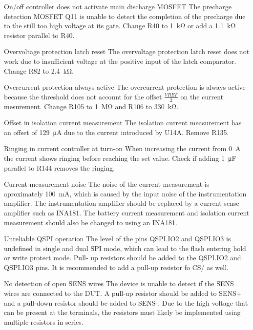 \begin{ModTable}
\ModItemOpen
{On/off controller does not activate main discharge MOSFET}
{The precharge detection MOSFET Q11 is unable to detect the completion of the precharge due to the still too high voltage at its gate. }
{Change R40 to \qty{1}{\kilo\ohm} or add a \qty{1.1}{\kilo\ohm} resistor parallel to R40. }
{}
{}

\ModItemOpen
{Overvoltage protection latch reset}
{The overvoltage protection latch reset does not work due to insufficient voltage at the positive input of the latch comparator. }
{Change R82 to \qty{2.4}{\kilo\ohm}. }
{}
{}

\ModItemOpen
{Overcurrent protection always active}
{The overcurrent protection is always active because the threshold does not account for the offset $\frac{VREF}{2}$ on the current mesurement. }
{Change R105 to \qty{1}{\mega\ohm} and R106 to \qty{330}{\kilo\ohm}. }
{}
{}

\ModItemOpen
{Offset in isolation current measurement}
{The isolation current measurement has an offset of \qty{129}{\micro\ampere} due to the current introduced by U14A. }
{Remove R135. }
{}
{}

\ModItemOpen
{Ringing in current controller at turn-on}
{When increasing the current from \qty{0}{\ampere} the current shows ringing before reaching the set value. }
{Check if adding \qty{1}{\micro\farad} parallel to R144 removes the ringing. }
{}
{}

\ModItemOpen
{Current measurement noise}
{The noise of the current measurement is aproximately \qty{100}{\milli\ampere}, which is caused by the input noise of the instrumentation amplifier. }
{The instrumentation amplifier should be replaced by a current sense amplifier such as INA181. The battery current measurement and isolation current measurement should also be changed to using an INA181. }
{}
{}

\ModItemOpen
{Unreliable QSPI operation}
{The level of the pins QSPI.IO2 and QSPI.IO3 is undefined in single and dual SPI mode, which can lead to the flash entering hold or write protect mode. }
{Pull- up resistors should be added to the QSPI.IO2 and QSPI.IO3 pins. It is recommended to add a pull-up resistor fo CS/ as well. }
{}
{}

\ModItemOpen
{No detection of open SENS wires}
{The device is unable to detect if the SENS wires are connected to the \ac{DUT}. }
{A pull-up resistor should be added to SENS+ and a pull-down resistor should be added to SENS-. Due to the high voltage that can be present at the terminals, the resistors must likely be implemented using multiple resistors in series. }
{}
{}


\end{ModTable}
